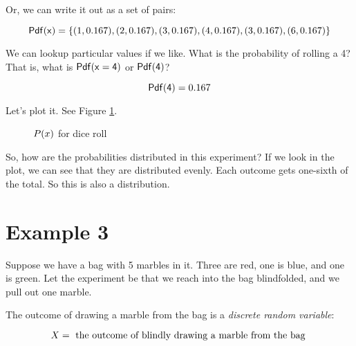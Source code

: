 \documentclass[../../../main.tex]{subfiles}
\begin{document}
\noindent
Or, we can write it out as a set of pairs:

\begin{equation*}
    \Pdf{\RandVarVal/} = \{ (1, 0.167), (2, 0.167), (3, 0.167), (4, 0.167), (3, 0.167), (6, 0.167) \}
\end{equation*}

\noindent
We can lookup particular values if we like. What is the probability of rolling a 4? That is, what is $\Pdf{\RandVarVal/ = 4}$ or $\mathsf{Pdf(4)}$?

\begin{equation*}
    \mathsf{Pdf(4)} = 0.167
\end{equation*}

\noindent
Let's plot it. See Figure \ref{plot:example-2}.

\begin{figure}[ht]
  \caption{\label{plot:example-2} $\Probability{\RandVarVal/}$ for dice roll}
\end{figure}

So, how are the probabilities distributed in this experiment? If we look in the plot, we can see that they are distributed evenly. Each outcome gets one-sixth of the total. So this is also a  distribution.



\section{Example 3}

Suppose we have a bag with 5 marbles in it. Three are red, one is blue, and one is green.
Let the experiment be that we reach into the bag blindfolded, and we pull out one marble.

The outcome of drawing a marble from the bag is a \emph{discrete random variable}:

\begin{equation*}
    \RandVar/ = \text{ the outcome of blindly drawing a marble from the bag }
\end{equation*}
\end{document}
